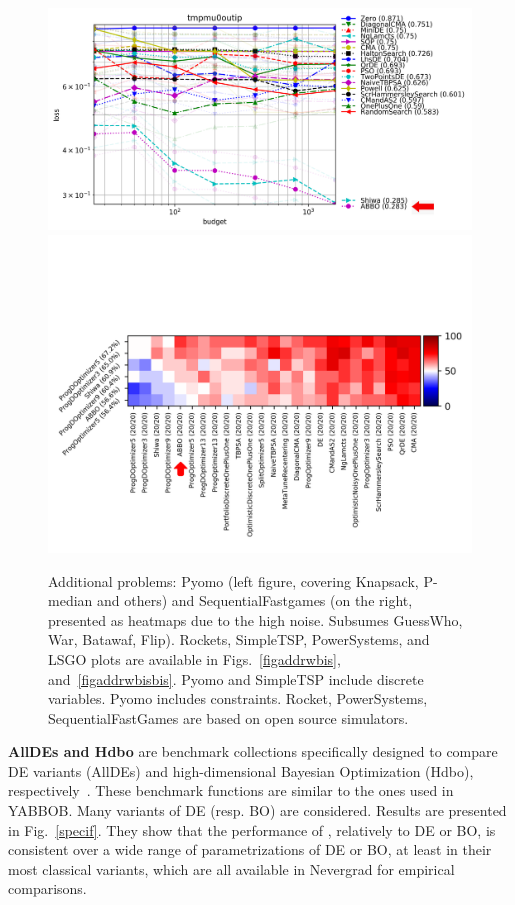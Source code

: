 \begin{figure}[t]
    \centering
\includegraphics[trim={0 0 0 28},clip,width=.58\textwidth]{sections/appendix/h220benchmarks/benchmark/xp_pyomo.png}
\includegraphics[trim={0 0 130 90},clip,width=.4\textwidth]{sections/appendix/h220benchmarks/benchmark/fa_sequential_fastgames.png}
\\%
	\caption{Additional problems: Pyomo (left figure, covering Knapsack, P-median and others) and SequentialFastgames (on the right, presented as heatmaps due to the high noise. Subsumes GuessWho, War, Batawaf, Flip). Rockets, SimpleTSP, PowerSystems, and LSGO plots are available in Figs.~\ref{figaddrwbis}, and~\ref{figaddrwbisbis}. Pyomo and SimpleTSP include discrete variables. Pyomo includes constraints. Rocket, PowerSystems, SequentialFastGames are based on open source simulators.}
	\label{figaddrw}
\end{figure}


\label{b2}
{\textbf{AllDEs and Hdbo}} are {benchmark collections specifically designed to compare DE variants (AllDEs) and high-dimensional Bayesian Optimization (Hdbo), respectively~\cite{nevergrad}.} %
These benchmark functions are similar to the ones used in YABBOB. %
Many variants of DE (resp. BO) are considered.
Results are presented in  Fig.~\ref{specif}. They show that the performance of \ngoptq{}, relatively to DE or BO, is consistent over a wide range of parametrizations of DE or BO, at least in their most classical variants, which are all available in Nevergrad for empirical comparisons. 


